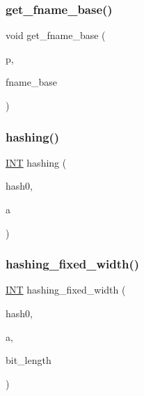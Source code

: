 \mbox{\label{util_8_c_a9f25fee3f57fa74a30296738b5ebee3d}} 
\subsubsection{\texorpdfstring{get\+\_\+fname\+\_\+base()}{get\_fname\_base()}}
{\footnotesize\ttfamily void get\+\_\+fname\+\_\+base (\begin{DoxyParamCaption}\item[{const char $\ast$}]{p,  }\item[{\mbox{\hyperlink{galois_8h_ab6cc7b4aeb6ea31aba2b3fbfc83ff5e6}{B\+Y\+TE}} $\ast$}]{fname\+\_\+base }\end{DoxyParamCaption})}

\mbox{\label{util_8_c_a9abb7260348436473e8c9213f159fe73}} 
\subsubsection{\texorpdfstring{hashing()}{hashing()}}
{\footnotesize\ttfamily \mbox{\hyperlink{galois_8h_a09fddde158a3a20bd2dcadb609de11dc}{I\+NT}} hashing (\begin{DoxyParamCaption}\item[{\mbox{\hyperlink{galois_8h_a09fddde158a3a20bd2dcadb609de11dc}{I\+NT}}}]{hash0,  }\item[{\mbox{\hyperlink{galois_8h_a09fddde158a3a20bd2dcadb609de11dc}{I\+NT}}}]{a }\end{DoxyParamCaption})}

\mbox{\label{util_8_c_aa20be7b7a515c2c4ec05923ad83ce886}} 
\subsubsection{\texorpdfstring{hashing\+\_\+fixed\+\_\+width()}{hashing\_fixed\_width()}}
{\footnotesize\ttfamily \mbox{\hyperlink{galois_8h_a09fddde158a3a20bd2dcadb609de11dc}{I\+NT}} hashing\+\_\+fixed\+\_\+width (\begin{DoxyParamCaption}\item[{\mbox{\hyperlink{galois_8h_a09fddde158a3a20bd2dcadb609de11dc}{I\+NT}}}]{hash0,  }\item[{\mbox{\hyperlink{galois_8h_a09fddde158a3a20bd2dcadb609de11dc}{I\+NT}}}]{a,  }\item[{\mbox{\hyperlink{galois_8h_a09fddde158a3a20bd2dcadb609de11dc}{I\+NT}}}]{bit\+\_\+length }\end{DoxyParamCaption})}

